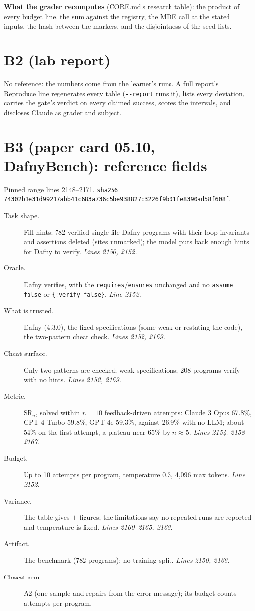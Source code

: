 \documentclass[11pt]{article}
\begin{document}
\textbf{What the grader recomputes} (CORE.md's research table): the product
of every budget line, the sum against the registry, the MDE call at the stated
inputs, the hash between the markers, and the disjointness of the seed lists.

\section*{B2 (lab report)}
No reference: the numbers come from the learner's runs. A full report's
Reproduce line regenerates every table (\verb+--report+ runs it), lists every
deviation, carries the gate's verdict on every claimed success, scores the
intervals, and discloses Claude as grader and subject.

\section*{B3 (paper card 05.10, DafnyBench): reference fields}
Pinned range lines 2148--2171,
\texttt{sha256 74302b1e31d99217abb41c683a736c5be938827c3226f9b01fe8390ad58f608f}.
\begin{description}
\item[Task shape.] Fill hints: 782 verified single-file Dafny programs with
  their loop invariants and assertions deleted (sites unmarked); the model puts
  back enough hints for Dafny to verify. \emph{Lines 2150, 2152.}
\item[Oracle.] Dafny verifies, with the \texttt{requires}/\texttt{ensures}
  unchanged and no \texttt{assume false} or \texttt{\{:verify false\}}.
  \emph{Line 2152.}
\item[What is trusted.] Dafny (4.3.0), the fixed specifications (some weak or
  restating the code), the two-pattern cheat check. \emph{Lines 2152, 2169.}
\item[Cheat surface.] Only two patterns are checked; weak specifications;
  208 programs verify with no hints. \emph{Lines 2152, 2169.}
\item[Metric.] $\mathrm{SR}_n$, solved within $n = 10$ feedback-driven
  attempts: Claude 3 Opus 67.8\%, GPT-4 Turbo 59.8\%, GPT-4o 59.3\%, against
  26.9\% with no LLM; about 54\% on the first attempt, a plateau near 65\% by
  $n \approx 5$. \emph{Lines 2154, 2158--2167.}
\item[Budget.] Up to 10 attempts per program, temperature 0.3, 4,096 max tokens.
  \emph{Line 2152.}
\item[Variance.] The table gives $\pm$ figures; the limitations say no
  repeated runs are reported and temperature is fixed. \emph{Lines 2160--2165,
  2169.}
\item[Artifact.] The benchmark (782 programs); no training split.
  \emph{Lines 2150, 2169.}
\item[Closest arm.] A2 (one sample and repairs from the error message); its
  budget counts attempts per program.
\end{description}
\end{document}
